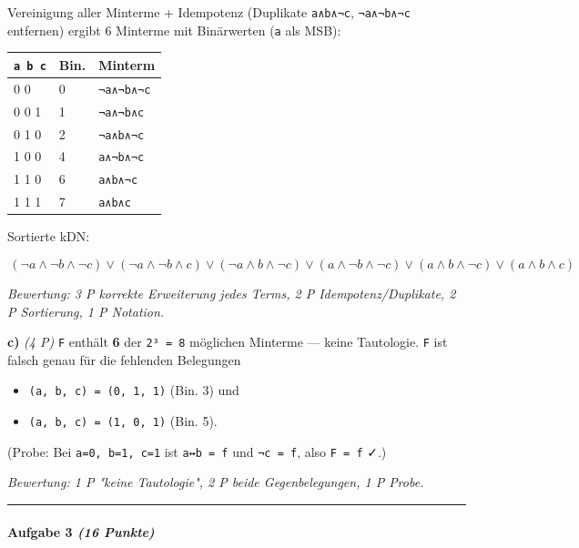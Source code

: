 \documentclass[11pt, a4paper]{article}
\begin{document}
Vereinigung aller Minterme + Idempotenz (Duplikate \texttt{a∧b∧¬c}, \texttt{¬a∧¬b∧¬c} entfernen) ergibt 6 Minterme mit Binärwerten (\texttt{a} als MSB):



{\small
\begin{tabularx}{\linewidth}{XXX}
\hline
\rowcolor{tableheadbg}
{\color{white}\textbf{\texttt{a b c}}} & {\color{white}\textbf{Bin.}} & {\color{white}\textbf{Minterm}} \\[2pt]
\hline
\endhead
\hline
\endfoot
0 0 0 & 0 & \texttt{¬a∧¬b∧¬c} \\
0 0 1 & 1 & \texttt{¬a∧¬b∧c} \\
0 1 0 & 2 & \texttt{¬a∧b∧¬c} \\
1 0 0 & 4 & \texttt{a∧¬b∧¬c} \\
1 1 0 & 6 & \texttt{a∧b∧¬c} \\
1 1 1 & 7 & \texttt{a∧b∧c} \\
\end{tabularx}
}


Sortierte kDN:

\[
\boxed{\,(\neg a \land \neg b \land \neg c) \lor (\neg a \land \neg b \land c) \lor (\neg a \land b \land \neg c) \lor (a \land \neg b \land \neg c) \lor (a \land b \land \neg c) \lor (a \land b \land c)\,}
\]


\textit{Bewertung: 3 P korrekte Erweiterung jedes Terms, 2 P Idempotenz/Duplikate, 2 P Sortierung, 1 P Notation.}


\textbf{c)} \textit{(4 P)} \texttt{F} enthält \textbf{6} der \texttt{2³ = 8} möglichen Minterme — keine Tautologie. \texttt{F} ist falsch genau für die fehlenden Belegungen

\begin{itemize}
  \item \texttt{(a, b, c) = (0, 1, 1)} (Bin. 3) und
  \item \texttt{(a, b, c) = (1, 0, 1)} (Bin. 5).
\end{itemize}

(Probe: Bei \texttt{a=0, b=1, c=1} ist \texttt{a↔b = f} und \texttt{¬c = f}, also \texttt{F = f} ✓.)


\textit{Bewertung: 1 P "keine Tautologie", 2 P beide Gegenbelegungen, 1 P Probe.}



\noindent\textcolor{rulegray}{\rule{\linewidth}{0.4pt}}


\paragraph{Aufgabe 3 \textit{(16 Punkte)}}\mbox{}\\[2pt]
\end{document}

